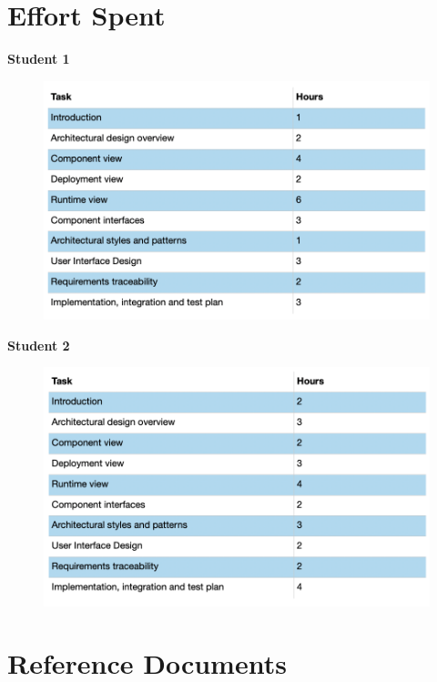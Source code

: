 \documentclass{article}
\begin{document}
\section{Effort Spent}

\textbf{Student 1}

\begin{figure}[H]
  \includegraphics[width=\linewidth]{effort1.png}
  
\end{figure}

\textbf{Student 2}

\begin{figure}[H]
  \includegraphics[width=\linewidth]{effort2.png}
  
\end{figure}

\section{Reference Documents}
\end{document}
